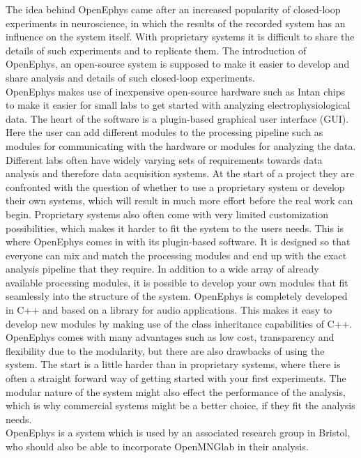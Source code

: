 The idea behind OpenEphys came after an increased popularity of closed-loop experiments in neuroscience, in which the results of the recorded system has an influence on the system itself. With proprietary systems it is difficult to share the details of such experiments and to replicate them. The introduction of OpenEphys, an open-source system is supposed to make it easier to develop and share analysis and details of such closed-loop experiments.\\
OpenEphys makes use of inexpensive open-source hardware such as Intan chips~\cite{openEphys} to make it easier for small labs to get started with analyzing electrophysiological data. The heart of the software is a plugin-based graphical user interface (GUI). Here the user can add different modules to the processing pipeline such as modules for communicating with the hardware or modules for analyzing the data.\\
Different labs often have widely varying sets of requirements towards data analysis and therefore data acquisition systems. At the start of a project they are confronted with the question of whether to use a proprietary system or develop their own systems, which will result in much more effort before the real work can begin. Proprietary systems also often come with very limited customization possibilities, which makes it harder to fit the system to the users needs. This is where OpenEphys comes in with its plugin-based software. It is designed so that everyone can mix and match the processing modules and end up with the exact analysis pipeline that they require. In addition to a wide array of already available processing modules, it is possible to develop your own modules that fit seamlessly into the structure of the system. OpenEphys is completely developed in C++ and based on a library for audio applications. This makes it easy to develop new modules by making use of the class inheritance capabilities of C++.\\
OpenEphys comes with many advantages such as low cost, transparency and flexibility due to the modularity, but there are also drawbacks of using the system. The start is a little harder than in proprietary systems, where there is often a straight forward way of getting started with your first experiments. The modular nature of the system might also effect the performance of the analysis, which is why commercial systems might be a better choice, if they fit the analysis needs.\\
OpenEphys is a system which is used by an associated research group in Bristol, who should also be able to incorporate OpenMNGlab in their analysis.

